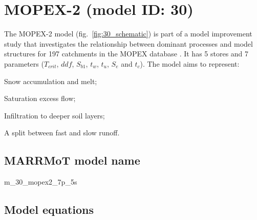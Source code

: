 \section{MOPEX-2 (model ID: 30)}
The MOPEX-2 model (fig.~\ref{fig:30_schematic}) is part of a model improvement study that investigates the relationship between dominant processes and model structures for 197 catchments in the MOPEX database \citep{Ye2012}. It has 5 stores and 7 parameters ($T_{crit}$, $ddf$, $S_{b1}$, $t_w$, $t_u$, $S_e$ and $t_c$). The model aims to represent:

\begin{itemizecompact}
\item Snow accumulation and melt;
\item Saturation excess flow;
\item Infiltration to deeper soil layers;
\item A split between fast and slow runoff.
\end{itemizecompact}

\subsection{MARRMoT model name}
m\_30\_mopex2\_7p\_5s \\

\subsection{Model equations}

